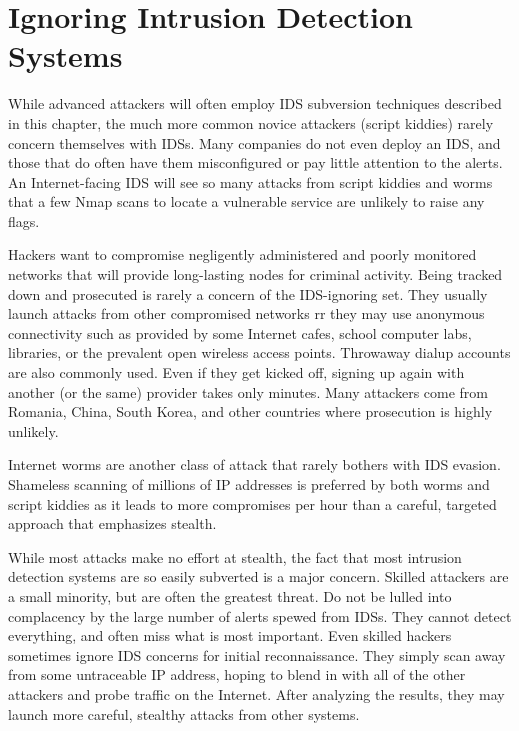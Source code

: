 \section{Ignoring Intrusion Detection Systems}
While advanced attackers will often employ IDS subversion techniques described in this chapter, the 
much more common novice attackers (script kiddies) rarely concern themselves with IDSs. 
Many companies do not even deploy an IDS, and those that do often have them misconfigured or pay little attention to the alerts. 
An Internet-facing IDS will see so many attacks from script kiddies and worms that a few Nmap scans to locate 
a vulnerable service are unlikely to raise any flags.

Hackers want to compromise negligently administered and poorly monitored networks that will provide long-lasting nodes for criminal activity.
Being tracked down and prosecuted is rarely a concern of the IDS-ignoring set. 
They usually launch attacks from other compromised networks rr they may use anonymous connectivity such as provided by 
some Internet cafes, school computer labs, libraries, or the prevalent open wireless access points. 
Throwaway dialup accounts are also commonly used. 
Even if they get kicked off, signing up again with another (or the same) provider takes only minutes. 
Many attackers come from Romania, China, South Korea, and other countries where prosecution is highly unlikely.

Internet worms are another class of attack that rarely bothers with IDS evasion. 
Shameless scanning of millions of IP addresses is preferred by both worms and script kiddies as it 
leads to more compromises per hour than a careful, targeted approach that emphasizes stealth.

While most attacks make no effort at stealth, the fact that most intrusion detection systems are so easily subverted is a major concern. 
Skilled attackers are a small minority, but are often the greatest threat. 
Do not be lulled into complacency by the large number of alerts spewed from IDSs. 
They cannot detect everything, and often miss what is most important.
Even skilled hackers sometimes ignore IDS concerns for initial reconnaissance. 
They simply scan away from some untraceable IP address, hoping to blend in with all of the other 
attackers and probe traffic on the Internet. 
After analyzing the results, they may launch more careful, stealthy attacks from other systems.

